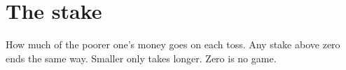 \section{The stake}

How much of the poorer one's money goes on each toss.
Any stake above zero ends the same way. Smaller only takes longer. Zero is no game.
